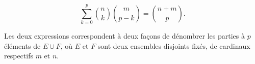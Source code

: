 \begin{prop}
    $$\sum_{k = 0}^{p} \binom{n}{k} \binom{m}{p-k} = \binom{n + m}{p}.$$
\end{prop}

Les deux expressions correspondent à deux façons de dénombrer les parties à $p$ éléments de $E \cup F$, où $E$ et $F$ sont deux ensembles disjoints fixés, de cardinaux respectifs $m$ et $n$. 
